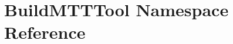 \hypertarget{namespaceBuildMTTTool}{\section{Build\-M\-T\-T\-Tool Namespace Reference}
\label{namespaceBuildMTTTool}
}
